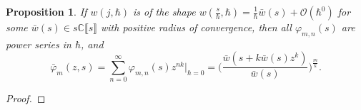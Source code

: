 \documentclass[10pt,a4paper,oneside,no-math,reqno]{amsart}%
\theoremstyle{plain}
\newtheorem{proposition}[theorem]{Proposition}
\theoremstyle{definition}
\theoremstyle{remark}
\numberwithin{equation}{section}
\renewcommand{\phi}{\varphi}
\newcommand{\mb}[1]{\mathbb{#1}}
\newcommand{\mc}[1]{\mathcal{#1}}
\newcommand{\1}{\mathds{1}}
\newcommand{\C}{\mb{C}}
\newcommand{\<}{\langle}
\renewcommand{\>}{\rangle}
\begin{document}
\begin{proposition}\label{ChangeOfCoords}
	If $ w(j, \hbar )$ is of the shape $ w(\frac{s}{\hbar}, \hbar) = \frac{1}{\hbar} \bar{w}(s)+ \mc{O} (\hbar^0)$ for some $ \bar{w} (s) \in s \C\llbracket s \rrbracket$ with positive radius of convergence, then all $ \phi_{m,n}(s)$ are power series in $ \hbar$, and
	\begin{equation}
		\bar{\phi}_m ( z, s) 
        =
        \sum_{n=0}^\infty \phi_{m,n} (s) z^{nk} \Big|_{\hbar = 0}
        =
        \Big( \frac{\bar{w}(s + k \bar{w}(s)z^k)}{\bar{w}(s)}\Big)^{\frac{m}{k}} .
	\end{equation}
\end{proposition}

\begin{proof}

\end{proof}
\end{document}
